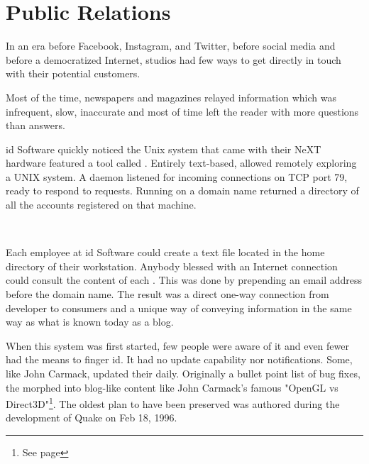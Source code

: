 \section{Public Relations}
In an era before Facebook, Instagram, and Twitter, before social media and before a democratized Internet, studios had few ways to get directly in touch with their potential customers.\\
\par Most of the time, newspapers and magazines relayed information which was infrequent, slow, inaccurate and most of time left the reader with more questions than answers.


id Software quickly noticed the Unix system that came with their NeXT hardware featured a tool called . Entirely text-based,  allowed remotely exploring a UNIX system. A  daemon listened for incoming connections on TCP port 79, ready to respond to requests. Running  on a domain name returned a directory of all the accounts registered on that machine.\\
\par
{}
\par
{}\\
\par

Each employee at id Software could create a  text file located in the home directory of their \NeXT workstation. Anybody blessed with an Internet connection could consult the content of each . This was done by prepending an email address before the domain name. The result was a direct one-way connection from developer to consumers and a unique way of conveying information in the same way as what is known today as a blog.\\
\par
When this system was first started, few people were aware of it and even fewer had the means to finger id. It had no update capability nor notifications. Some, like John Carmack, updated their  daily. Originally a bullet point list of bug fixes, the  morphed into blog-like content like John Carmack's famous "OpenGL vs Direct3D"\footnote{See page \pageref{openglvsdirectd}}. The oldest plan to have been preserved was authored during the development of Quake on Feb 18, 1996.



